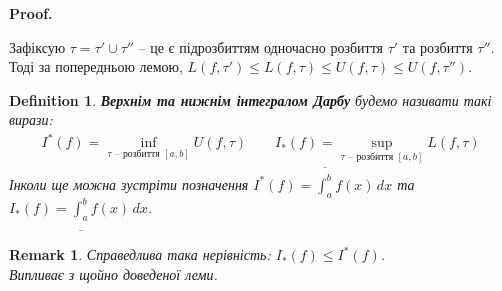 \documentclass[a4paper, 10pt]{article}
\makeatletter
\def\huge{\displaystyle}
\theoremstyle{theoremdd}
\theoremstyle{theoremdd}
\theoremstyle{theoremdd}
\newtheorem{definition}[theorem]{Definition}
\theoremstyle{theoremdd}
\theoremstyle{theoremdd}
\theoremstyle{theoremdd}
\newtheorem{proposition}[theorem]{Proposition}
\theoremstyle{theoremdd}
\newtheorem{remark}[theorem]{Remark}
\theoremstyle{theoremdd}
\theoremstyle{theoremdd}
\renewenvironment{proof}[1][Proof.\\]{\par
\pushQED{\hfill \qed}%
\normalfont \topsep6\p@\@plus6\p@\relax
\trivlist
\item\relax
{\bfseries
#1\@addpunct{.}}\hspace\labelsep\ignorespaces
}{%
\popQED\endtrivlist\@endpefalse
}
\makeatother
\begin{document}
\begin{proof}
Зафіксую $\tau = \tau' \cup \tau''$ -- це є підрозбиттям одночасно розбиття $\tau'$ та розбиття $\tau''$. Тоді за попередньою лемою, $L(f,\tau') \leq L(f,\tau) \leq U(f,\tau) \leq U(f,\tau'')$.
\end{proof}

\begin{definition}
\textbf{Верхнім та нижнім інтегралом Дарбу} будемо називати такі вирази:
\begin{align*}
I^*(f) = \inf_{\tau \text{ -- розбиття } [a,b]} U(f, \tau) \qquad I_*(f) = \sup_{\tau \text{ -- розбиття } [a,b]} L(f,\tau)
\end{align*}
Інколи ще можна зустріти позначення $I^*(f) = \displaystyle\overline{\int_a^b} f(x)\,dx$ та $I_*(f) = \displaystyle\underline{\int_a^b} f(x)\,dx$.
\end{definition}

\begin{remark}
Справедлива така нерівність: $I_*(f) \leq I^*(f)$.\\
\textit{Випливає з щойно доведеної леми.}
\end{remark}

\end{document}
